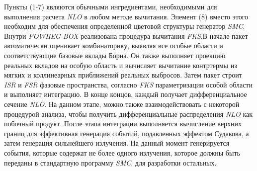 Пункты (1-7) являются обычными ингредиентами, необходимыми для выполнения расчета \textit{NLO}
в любом методе вычитания. Элемент (8) вместо этого необходим для обеспечения определенной цветовой структуры
генератор \textit{SMC}. Внутри \textit{POWHEG-BOX} реализована процедура вычитания \textit{FKS}.В начале пакет автоматически оценивает комбинаторику, выявляя
все особые области и соответствующие базовые вклады Борна. Он также выполняет
проекцию реальных вкладов на особую область и вычисляет вычитание
контртермы из мягких и коллинеарных приближений реальных выбросов. Затем пакет строит
\textit{ISR} и \textit{FSR} фазовые пространства, согласно \textit{FKS} параметризации особой области и
выполняет интеграцию. В конце концов, каждый получает дифференциальное сечение \textit{NLO}. На данном этапе,
можно также взаимодействовать с некоторой процедурой анализа, чтобы получить дифференциальные распределения \textit{NLO} как
побочный продукт. После этапа интеграции выполняется вычисление верхних границ для
эффективная генерация событий, подавленных эффектом Судакова, а затем генерация сильнейшего излучения. На данный момент генерируется события, которые содержат не более одного излучения, которое должны быть переданы в стандартную программу \textit{SMC}, для разработки остальных.

